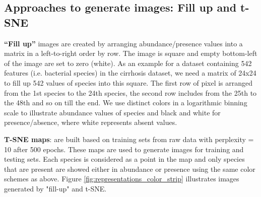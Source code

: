 \documentclass{article}
\begin{document}
\subsection{Approaches to generate images: Fill up and t-SNE}
\textbf{“Fill up”} images are created by arranging abundance/presence values into a matrix in a left-to-right order by row. The image is square and empty bottom-left of the image are set to zero (white). As an example for a dataset containing 542 features (i.e. bacterial species) in the cirrhosis dataset, we need a matrix of 24x24 to fill up 542 values of species into this square. The first row of pixel is arranged from the 1st species to the 24th species, the second row includes from the 25th to the 48th and so on till the end. We use distinct colors in a logarithmic binning scale to illustrate abundance values of species and black and white for presence/absence, where white represents absent values.

\textbf{T-SNE maps}: are built based on training sets from raw data with perplexity = 10 after 500 epochs. These maps are used to generate images for training and testing sets. %
Each species is considered as a point in the map and only species that are present are showed either in abundance or presence using the same color schemes as above. Figure \ref{fig:representations_color_strip} illustrates images generated by "fill-up" and t-SNE.
\end{document}
